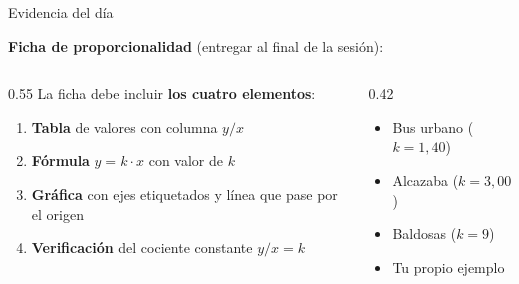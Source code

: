 \documentclass[aspectratio=169, 10pt, spanish]{beamer}
\begin{document}
\begin{frame}{Evidencia del día}
  \begin{evidenciabox}
    \textbf{Ficha de proporcionalidad} (entregar al final de la sesión):

    \vspace{0.3cm}
    \begin{columns}[t]
      \begin{column}{0.55\textwidth}
        La ficha debe incluir \textbf{los cuatro elementos}:
        \begin{enumerate}
          \item \textbf{Tabla} de valores con columna $y/x$
          \item \textbf{Fórmula} $y = k \cdot x$ con valor de $k$
          \item \textbf{Gráfica} con ejes etiquetados y línea que pase por el origen
          \item \textbf{Verificación} del cociente constante $y/x = k$
        \end{enumerate}
      \end{column}
      \begin{column}{0.42\textwidth}
        \begin{notabox}
          \begin{itemize}
            \item Bus urbano ($k = 1{,}40$)
            \item Alcazaba ($k = 3{,}00$)
            \item Baldosas ($k = 9$)
            \item Tu propio ejemplo
          \end{itemize}
        \end{notabox}
      \end{column}
    \end{columns}
  \end{evidenciabox}
\end{frame}
\end{document}

